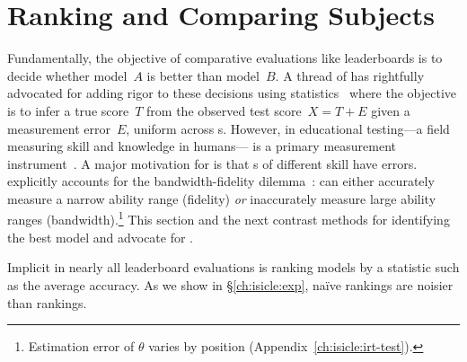 \section{Ranking and Comparing Subjects}
\label{ch:isicle:compare}


Fundamentally, the objective of comparative evaluations like
leaderboards is to decide whether model~$A$ is better than model~$B$.
A thread of \nlp{} has rightfully advocated for adding rigor to these
decisions using statistics~\citep[Classical Testing
  Theory]{traub1997ctt} where the objective is to infer a true
score~$T$ from the observed test score~$X=T+E$ given a measurement
error~$E$, uniform across \subj{}s.
However, in educational testing---a field measuring skill and
knowledge in humans---\irt{} is a primary measurement
instrument~\citep[p.~2]{hambleton1991fundamentals}.
A major motivation for \irt{} is that \subj{}s of different skill have
 errors.
\irt{} explicitly accounts for the bandwidth-fidelity
dilemma~\citep{mcbride1976bandwidth}: \itms{} can either accurately
measure a narrow ability range (fidelity) \textit{or} inaccurately
measure large ability ranges (bandwidth).\footnote{Estimation error
  of $\theta$ varies by position (Appendix~\ref{ch:isicle:irt-test}).  }
This section and the next contrast methods for identifying the best
model and advocate for \irt{}.

\label{ch:isicle:agg}


Implicit in nearly all leaderboard evaluations is ranking models by a
statistic such as the average accuracy.
As we show in \S\ref{ch:isicle:exp}, na\"ive rankings are noisier than \irt{} rankings.
